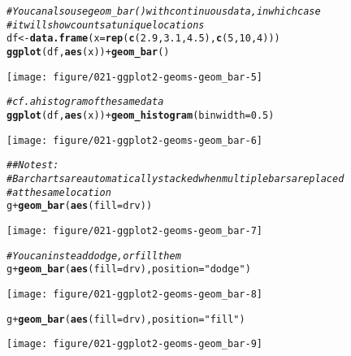 \documentclass[a4paper,titlepage]{tufte-handout}\usepackage[]{graphicx}\usepackage[]{color}
\makeatletter
\def\maxwidth{ %
  \ifdim\Gin@nat@width>\linewidth
    \linewidth
  \else
    \Gin@nat@width
  \fi
}
\newcommand{\hlnum}[1]{\textcolor[rgb]{0.686,0.059,0.569}{#1}}%
\newcommand{\hlstr}[1]{\textcolor[rgb]{0.192,0.494,0.8}{#1}}%
\newcommand{\hlcom}[1]{\textcolor[rgb]{0.678,0.584,0.686}{\textit{#1}}}%
\newcommand{\hlopt}[1]{\textcolor[rgb]{0,0,0}{#1}}%
\newcommand{\hlstd}[1]{\textcolor[rgb]{0.345,0.345,0.345}{#1}}%
\newcommand{\hlkwb}[1]{\textcolor[rgb]{0.69,0.353,0.396}{#1}}%
\newcommand{\hlkwc}[1]{\textcolor[rgb]{0.333,0.667,0.333}{#1}}%
\newcommand{\hlkwd}[1]{\textcolor[rgb]{0.737,0.353,0.396}{\textbf{#1}}}%
\newenvironment{kframe}{%
 \def\at@end@of@kframe{}%
 \ifinner\ifhmode%
  \def\at@end@of@kframe{\end{minipage}}%
  \begin{minipage}{\columnwidth}%
 \fi\fi%
 \def\FrameCommand##1{\hskip\@totalleftmargin \hskip-\fboxsep
 \colorbox{shadecolor}{##1}\hskip-\fboxsep
     \hskip-\linewidth \hskip-\@totalleftmargin \hskip\columnwidth}%
 \MakeFramed {\advance\hsize-\width
   \@totalleftmargin\z@ \linewidth\hsize
   \@setminipage}}%
 {\par\unskip\endMakeFramed%
 \at@end@of@kframe}
\newenvironment{knitrout}{}{} %
\makeatother
\begin{document}
\begin{knitrout}
\begin{kframe}
\begin{alltt}
\hlcom{# You can also use geom_bar() with continuous data, in which case}
\hlcom{# it will show counts at unique locations}
\hlstd{df} \hlkwb{<-} \hlkwd{data.frame}\hlstd{(}\hlkwc{x} \hlstd{=} \hlkwd{rep}\hlstd{(}\hlkwd{c}\hlstd{(}\hlnum{2.9}\hlstd{,} \hlnum{3.1}\hlstd{,} \hlnum{4.5}\hlstd{),} \hlkwd{c}\hlstd{(}\hlnum{5}\hlstd{,} \hlnum{10}\hlstd{,} \hlnum{4}\hlstd{)))}
\hlkwd{ggplot}\hlstd{(df,} \hlkwd{aes}\hlstd{(x))} \hlopt{+} \hlkwd{geom_bar}\hlstd{()}
\end{alltt}
\end{kframe}
\texttt{[image: figure/021-ggplot2-geoms-geom\_bar-5]} 
\begin{kframe}\begin{alltt}
\hlcom{# cf. a histogram of the same data}
\hlkwd{ggplot}\hlstd{(df,} \hlkwd{aes}\hlstd{(x))} \hlopt{+} \hlkwd{geom_histogram}\hlstd{(}\hlkwc{binwidth} \hlstd{=} \hlnum{0.5}\hlstd{)}
\end{alltt}
\end{kframe}
\texttt{[image: figure/021-ggplot2-geoms-geom\_bar-6]} 
\begin{kframe}\begin{alltt}
\hlcom{## No test: }
\hlcom{# Bar charts are automatically stacked when multiple bars are placed}
\hlcom{# at the same location}
\hlstd{g} \hlopt{+} \hlkwd{geom_bar}\hlstd{(}\hlkwd{aes}\hlstd{(}\hlkwc{fill} \hlstd{= drv))}
\end{alltt}
\end{kframe}
\texttt{[image: figure/021-ggplot2-geoms-geom\_bar-7]} 
\begin{kframe}\begin{alltt}
\hlcom{# You can instead dodge, or fill them}
\hlstd{g} \hlopt{+} \hlkwd{geom_bar}\hlstd{(}\hlkwd{aes}\hlstd{(}\hlkwc{fill} \hlstd{= drv),} \hlkwc{position} \hlstd{=} \hlstr{"dodge"}\hlstd{)}
\end{alltt}
\end{kframe}
\texttt{[image: figure/021-ggplot2-geoms-geom\_bar-8]} 
\begin{kframe}\begin{alltt}
\hlstd{g} \hlopt{+} \hlkwd{geom_bar}\hlstd{(}\hlkwd{aes}\hlstd{(}\hlkwc{fill} \hlstd{= drv),} \hlkwc{position} \hlstd{=} \hlstr{"fill"}\hlstd{)}
\end{alltt}
\end{kframe}
\texttt{[image: figure/021-ggplot2-geoms-geom\_bar-9]} 
\begin{kframe}\begin{alltt}

\end{alltt}
\end{kframe}
\end{knitrout}
\end{document}
